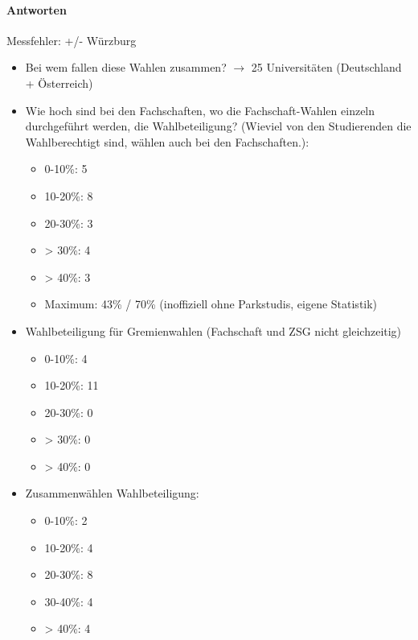       \paragraph{Antworten}

        Messfehler: +/- Würzburg

        \begin{itemize}
          \item Bei wem fallen diese Wahlen zusammen?
            $\rightarrow$ 25 Universitäten (Deutschland + Österreich)

          \item Wie hoch sind bei den Fachschaften, wo die Fachschaft-Wahlen einzeln durchgeführt werden, die Wahlbeteiligung? (Wieviel von den Studierenden die Wahlberechtigt sind, wählen auch bei den Fachschaften.):
            \begin{itemize}
              \item 0-10\%: 5
              \item 10-20\%: 8
              \item 20-30\%: 3
              \item > 30\%: 4
              \item > 40\%: 3
              \item Maximum: 43\% / 70\% (inoffiziell ohne Parkstudis, eigene Statistik)
            \end{itemize}

          \item Wahlbeteiligung für Gremienwahlen (Fachschaft und ZSG nicht gleichzeitig)
            \begin{itemize}
              \item 0-10\%: 4
              \item 10-20\%: 11
              \item 20-30\%: 0
              \item > 30\%: 0
              \item > 40\%: 0
            \end{itemize}

          \item Zusammenwählen Wahlbeteiligung:
            \begin{itemize}
              \item 0-10\%: 2
              \item 10-20\%: 4
              \item 20-30\%: 8
              \item 30-40\%: 4
              \item > 40\%: 4
            \end{itemize}


\end{itemize}
